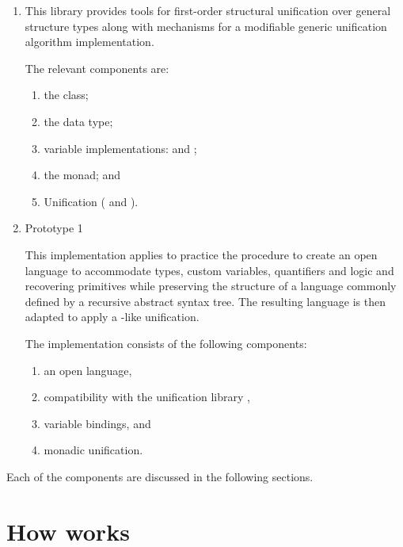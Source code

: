 \documentclass[thesis-solanki.tex]{subfiles}
\begin{document}
\begin{enumerate}
\item {} \cite{unification-fd-lib}

This library provides tools for first-order structural unification over general structure types along with mechanisms for a modifiable
generic unification algorithm implementation.

The relevant components are:
\begin{enumerate}
\item the  class;

\item the  data type;

\item variable implementations:
   and ;

\item the  monad; and 

\item Unification ( and ).
\end{enumerate}

\item Prototype 1

  This implementation applies to practice the procedure to create an open language to accommodate types,
  custom variables, quantifiers and logic and recovering primitives while preserving the structure of a
  language commonly defined by a recursive abstract syntax tree.
  The resulting language is then adapted to apply a -like unification.

The implementation consists of the following components:
\begin{enumerate}
\item an open language,

\item compatibility with the unification library \cite{unification-fd-lib},

\item variable bindings, and

\item monadic unification.

\end{enumerate}
\end{enumerate}

Each of the components are discussed in the following sections.


\section{How  works}
\end{document}
